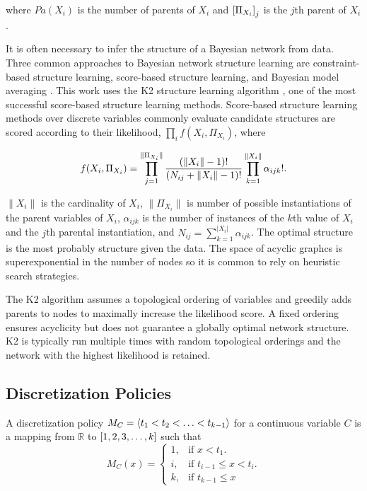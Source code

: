 \noindent
where $Pa(X_i)$ is the number of parents of $X_i$ and $\brock{\Pi_{X_i}}_j$ is the $j$th parent of $X_i$.

It is often necessary to infer the structure of a Bayesian network from data.
Three common approaches to Bayesian network structure learning are constraint-based structure learning, score-based structure learning, and Bayesian model averaging \citep[see][chap.~18]{PGM_2009}. This work uses the K2 structure learning algorithm \citep{K2}, one of the most successful score-based structure learning methods.
Score-based structure learning methods over discrete variables commonly evaluate candidate structures are scored according to their likelihood, $\prod_i f(X_i, \Pi_{X_i})$, where

\begin{align}
f(X_i, \Pi_{X_i}) = \prod_{j=1}^{\|\Pi_{X_i}\|} {{(\|X_i\|-1)!}\over{(N_{ij} + \|X_i\|-1)!}} \prod_{k=1}^{\|X_i\|} \alpha_{ijk}!\text{.}
\end{align}

\noindent
$\|X_i\|$ is the cardinality of $X_i$, $\|\Pi_{X_i}\|$ is number of possible instantiations of the parent variables of $X_i$, $\alpha_{ijk}$ is the number of instances of the $k$th value of $X_i$ and the $j$th parental instantiation, and $N_{ij} = \sum_{k=1}^{|X_i|} \alpha_{ijk}$.
The optimal structure is the most probably structure given the data.
The space of acyclic graphcs is superexponential in the number of nodes \citep{PGM_2009} so it is common to rely on heuristic search strategies.

The K2 algorithm assumes a topological ordering of variables and greedily adds parents to nodes to maximally increase the likelihood score.
A fixed ordering ensures acyclicity but does not guarantee a globally optimal network structure.
K2 is typically run multiple times with random topological orderings and the network with the highest likelihood is retained.

\subsection{Discretization Policies}

A discretization policy $M_C = \langle t_1 < t_2 < \ldots < t_{k-1} \rangle$ for a continuous variable $C$ is a mapping from $\mathbb{R}$ to $\brock{1,2,3,\ldots,k}$ such that
\begin{equation}
  M_C (x)=\begin{cases}
    1, & \text{if $x<t_1$}.\\
    i, & \text{if $t_{i-1} \leq x < t_i$}\text{.}\\
    k, & \text{if $t_{k-1} \leq x$}
  \end{cases}
\end{equation}

